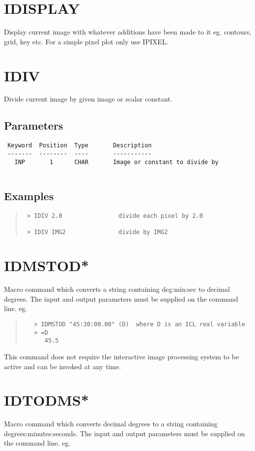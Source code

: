\documentclass{book}
\renewcommand{\_}{{\tt\char'137}}     %
\begin{document}
\section{IDISPLAY}
Display current image with whatever additions have been made to
it eg. contours, grid, key etc. For a simple pixel plot only use
IPIXEL.
 
\section{IDIV}
Divide current image by given image or scalar constant.
 
\subsection{Parameters}
\begin{verbatim}
 Keyword  Position  Type       Description
 -------  --------  ----       -----------
   INP       1      CHAR       Image or constant to divide by
 
\end{verbatim}\subsection{Examples}
\begin{quote}\begin{verbatim}
 > IDIV 2.0                divide each pixel by 2.0
 
 > IDIV IMG2               divide by IMG2
\end{verbatim}\end{quote}
\section{IDMSTOD*}
Macro command which converts a string containing deg:min:sec to
decimal degrees. The input and output parameters must be supplied
on the command line. eg.
 
\begin{quote}\begin{verbatim}
   > IDMSTOD "45:30:00.00" (D)  where D is an ICL real variable
   > =D
      45.5
 \end{verbatim}\end{quote}
This command does not require the interactive image processing
system to be active and can be invoked at any time.
 
\section{IDTODMS*}
Macro command which converts decimal degrees to a string containing
degrees:minutes:seconds. The input and output parameters must be
supplied on the command line. eg.
 
\end{document}
